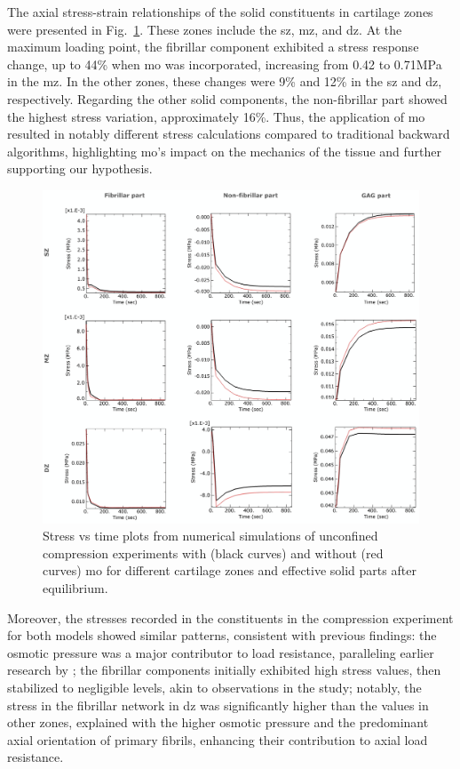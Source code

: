 \documentclass[12pt,a4paper]{report}
\begin{document}
The axial stress-strain relationships of the solid constituents in cartilage zones were presented in Fig.~\ref{fig:parts_stress_strain}. These zones include the \ac{sz}, \ac{mz}, and \ac{dz}. At the maximum loading point, the fibrillar component exhibited a stress response change, up to 44\% when mo was incorporated, increasing from 0.42 to 0.71MPa in the \ac{mz}. In the other zones, these changes were 9\% and 12\% in the \ac{sz} and \ac{dz}, respectively. Regarding the other solid components, the non-fibrillar part showed the highest stress variation, approximately 16\%. Thus, the application of \ac{mo} resulted in notably different stress calculations compared to traditional backward algorithms, highlighting \ac{mo}'s impact on the mechanics of the tissue and further supporting our hypothesis.
%
\begin{figure}\centering
\includegraphics[width=\textwidth]{img/parts_stress_strain.jpg}
\caption{Stress vs time plots from numerical simulations of unconfined compression experiments with (black curves) and without (red curves) \ac{mo} for different cartilage zones and effective solid parts after equilibrium.}
\label{fig:parts_stress_strain}
\end{figure}

Moreover, the stresses recorded in the constituents in the compression experiment for both models showed similar patterns, consistent with previous findings: the osmotic pressure was a major contributor to load resistance, paralleling earlier research by \cite{quiroga2017}; the fibrillar components initially exhibited high stress values, then stabilized to negligible levels, akin to observations in the \cite{wilson2007} study; notably, the stress in the fibrillar network in \ac{dz} was significantly higher than the values in other zones, explained with the higher osmotic pressure and the predominant axial orientation of primary fibrils, enhancing their contribution to axial load resistance.
\end{document}
